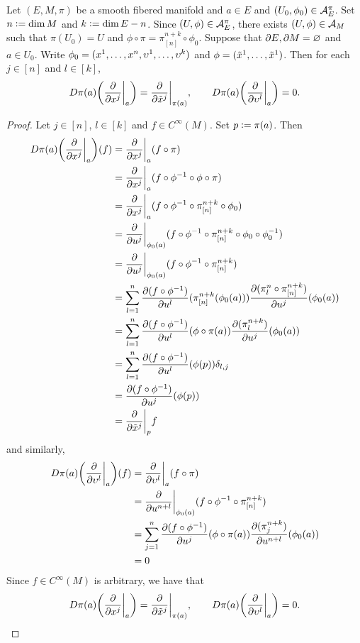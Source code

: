 \documentclass{book}
\begin{document}
\begin{ex}
	Let $(E, M, \pi)$ be a smooth fibered manifold and $a \in E$ and $(U_0, \phi_0) \in \mathcal{A}_E^{\pi}$. Set $n \vcentcolon= \dim M$ and $k \vcentcolon= \dim E - n$. Since $(U, \phi) \in \mathcal{A}_E^{\pi}$, there exists $(U, \phi) \in \mathcal{A}_M$ such that $\pi(U_0) = U$ and $\phi \circ \pi = \pi^{n+k}_{[n]} \circ \phi_0$. Suppose that $\partial E, \partial M = \varnothing$ and $a \in U_0$. Write $\phi_0 = (x^1, \ldots, x^n, \upsilon^1, \ldots, \upsilon^k)$ and $\phi = (\tilde{x}^1, \ldots, \tilde{x}^1)$. Then for each $j \in [n]$ and $l \in [k]$,
	$$ D \pi(a) \bigg( \frac{\partial}{\partial x^j} \bigg|_a \bigg) = \frac{\partial}{\partial \tilde{x}^j} \bigg|_{\pi(a)}, \quad \quad D \pi(a) \bigg( \frac{\partial}{\partial \upsilon^l} \bigg|_a \bigg) = 0.$$  
\end{ex}

\begin{proof}
	Let $j \in [n]$, $l \in [k]$ and $f \in C^{\infty}(M)$. Set $p \vcentcolon= \pi(a)$. Then
	\begin{align*}
		D \pi(a) \bigg( \frac{\partial}{\partial x^j} \bigg|_a \bigg) (f)
		& = \frac{\partial}{\partial x^j} \bigg|_a (f \circ \pi) \\
		& = \frac{\partial}{\partial x^j} \bigg|_a (f \circ \phi^{-1} \circ \phi \circ \pi) \\
		& = \frac{\partial}{\partial x^j} \bigg|_a (f \circ \phi^{-1} \circ \pi^{n+k}_{[n]} \circ  \phi_0) \\
		& = \frac{\partial}{\partial u^j} \bigg|_{\phi_0(a)} (f \circ \phi^{-1} \circ \pi^{n+k}_{[n]} \circ  \phi_0 \circ \phi_0^{-1}) \\
		& = \frac{\partial}{\partial u^j} \bigg|_{\phi_0(a)} (f \circ \phi^{-1} \circ \pi^{n+k}_{[n]}) \\
		& = \sum_{l=1}^n \frac{\partial (f \circ \phi^{-1})}{\partial u^l}(\pi^{n+k}_{[n]}(\phi_0(a)))  \frac{\partial(\pi^n_l \circ \pi^{n+k}_{[n]})}{\partial u^j}(\phi_0(a))  \\
		& = \sum_{l=1}^n \frac{\partial (f \circ \phi^{-1})}{\partial u^l}(\phi \circ \pi(a))  \frac{\partial(\pi^{n+k}_l)}{\partial u^j}(\phi_0(a)) \\
		& = \sum_{l=1}^n \frac{\partial (f \circ \phi^{-1})}{\partial u^l}(\phi(p))   \delta_{l,j} \\
		& = \frac{\partial (f \circ \phi^{-1})}{\partial u^j}(\phi(p))  \\
		& = \frac{\partial}{\partial \tilde{x}^j} \bigg|_p f  \\
	\end{align*}
	and similarly,
	\begin{align*}
		D \pi(a) \bigg( \frac{\partial}{\partial \upsilon^l} \bigg|_a \bigg) (f)
		& = \frac{\partial}{\partial \upsilon^l} \bigg|_a (f \circ \pi) \\
		& = \frac{\partial}{\partial u^{n+l}} \bigg|_{\phi_0(a)} (f \circ \phi^{-1} \circ \pi^{n+k}_{[n]}) \\
		& = \sum_{j=1}^n \frac{\partial (f \circ \phi^{-1})}{\partial u^j}(\phi \circ \pi(a))  \frac{\partial(\pi^{n+k}_j)}{\partial u^{n+l}}(\phi_0(a)) \\
		& = 0
	\end{align*}
	Since $f \in C^{\infty}(M)$ is arbitrary, we have that $$D \pi(a) \bigg( \frac{\partial}{\partial x^j} \bigg|_a \bigg) = \frac{\partial}{\partial \tilde{x}^j} \bigg|_{\pi(a)}, \quad \quad D \pi(a) \bigg( \frac{\partial}{\partial \upsilon^l} \bigg|_a \bigg) = 0.$$
\end{proof}
\end{document}
